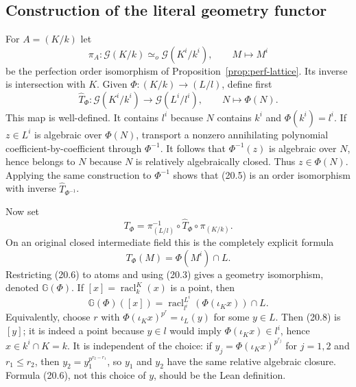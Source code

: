 \documentclass[11pt,oneside]{article}
\theoremstyle{definition}
\theoremstyle{remark}
\newcommand{\G}{\mathcal{G}}
\begin{document}
\subsection{Construction of the literal geometry functor}

For $A=(K/k)$ let
\[
 \pi_A:\G(K/k)\simeq_o\G(K^i/k^i),\qquad M\longmapsto M^i       \tag{20.4}
\]
be the perfection order isomorphism of Proposition~\ref{prop:perf-lattice}.  Its inverse
is intersection with $K$.  Given
$\Phi:(K/k)\to(L/l)$, define first
\[
 \widehat T_\Phi:\G(K^i/k^i)\longrightarrow\G(L^i/l^i),
 \qquad N\longmapsto\Phi(N).                                  \tag{20.5}
\]
This map is well-defined.  It contains $l^i$ because $N$ contains $k^i$ and
$\Phi(k^i)=l^i$.  If $z\in L^i$ is algebraic over $\Phi(N)$, transport a nonzero
annihilating polynomial coefficient-by-coefficient through $\Phi^{-1}$.  It follows that
$\Phi^{-1}(z)$ is algebraic over $N$, hence belongs to $N$ because $N$ is relatively
algebraically closed.  Thus $z\in\Phi(N)$.  Applying the same construction to
$\Phi^{-1}$ shows that (20.5) is an order isomorphism with inverse
$\widehat T_{\Phi^{-1}}$.

Now set
\[
 T_\Phi=\pi_{(L/l)}^{-1}\circ\widehat T_\Phi\circ\pi_{(K/k)}.
                                                                    \tag{20.6}
\]
On an original closed intermediate field this is the completely explicit formula
\[
 T_\Phi(M)=\Phi(M^i)\cap L.                                    \tag{20.7}
\]
Restricting (20.6) to atoms and using (20.3) gives a geometry isomorphism, denoted
$\mathbb G(\Phi)$.  If $[x]=\operatorname{racl}_k^K(x)$ is a point, then
\[
 \mathbb G(\Phi)([x])
 =\operatorname{racl}_{l^i}^{L^i}(\Phi(\iota_Kx))\cap L.       \tag{20.8}
\]
Equivalently, choose $r$ with
$\Phi(\iota_Kx)^{p^r}=\iota_L(y)$ for some $y\in L$.  Then (20.8) is $[y]$; it is
indeed a point because $y\in l$ would imply
$\Phi(\iota_Kx)\in l^i$, hence $x\in k^i\cap K=k$.  It is independent of the choice:
if $y_j=\Phi(\iota_Kx)^{p^{r_j}}$ for $j=1,2$ and $r_1\leq r_2$, then
$y_2=y_1^{p^{r_2-r_1}}$, so $y_1$ and $y_2$ have the same relative algebraic closure.
Formula (20.6), not this choice of $y$, should be the Lean definition.
\end{document}
